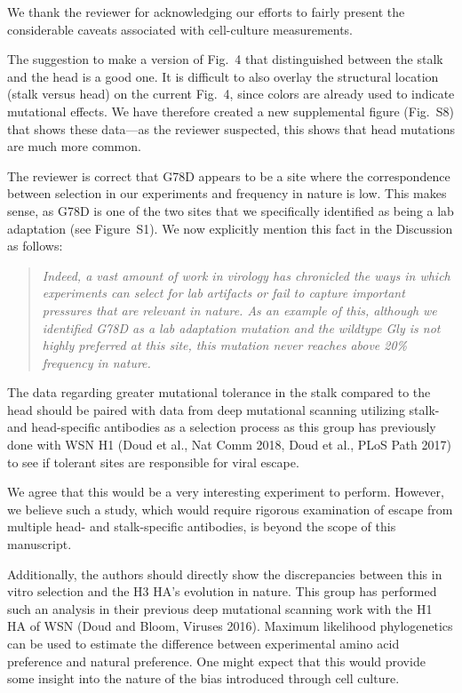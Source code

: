 \documentclass[11pt, oneside]{article}   	%
\newcommand{\response}[1]{{\color{black}#1}}
\begin{document}
\response{We thank the reviewer for acknowledging our efforts to fairly present the considerable caveats associated with cell-culture measurements.

The suggestion to make a version of Fig.~4 that distinguished between the stalk and the head is a good one.
It is difficult to also overlay the structural location (stalk versus head) on the current Fig.~4, since colors are already used to indicate mutational effects.
We have therefore created a new supplemental figure (Fig.~S8) that shows these data---as the reviewer suspected, this shows that head mutations are much more common.

The reviewer is correct that G78D appears to be a site where the correspondence between selection in our experiments and frequency in nature is low.
This makes sense, as G78D is one of the two sites that we specifically identified as being a lab adaptation (see Figure~S1).
We now explicitly mention this fact in the Discussion as follows:

\begin{quote}
\textsl{Indeed, a vast amount of work in virology has chronicled the ways in which experiments can select for lab artifacts or fail to capture important pressures that are relevant in nature.
As an example of this, although we identified G78D as a lab adaptation mutation and the wildtype Gly is not highly preferred at this site, this mutation never reaches above 20\% frequency in nature. }
\end{quote}
} 

The data regarding greater mutational tolerance in the stalk compared to the head should be paired with data from deep mutational scanning utilizing stalk- and head-specific antibodies as a selection process as this group has previously done with WSN H1 (Doud et al., Nat Comm 2018, Doud et al., PLoS Path 2017) to see if tolerant sites are responsible for viral escape. 

\response{We agree that this would be a very interesting experiment to perform.
However, we believe such a study, which would require rigorous examination of escape from multiple head- and stalk-specific antibodies, is beyond the scope of this manuscript.
}

Additionally, the authors should directly show the discrepancies between this in vitro selection and the H3 HA's evolution in nature. This group has performed such an analysis in their previous deep mutational scanning work with the H1 HA of WSN (Doud and Bloom, Viruses 2016). Maximum likelihood phylogenetics can be used to estimate the difference between experimental amino acid preference and natural preference. One might expect that this would provide some insight into the nature of the bias introduced through cell culture. 
\end{document}
